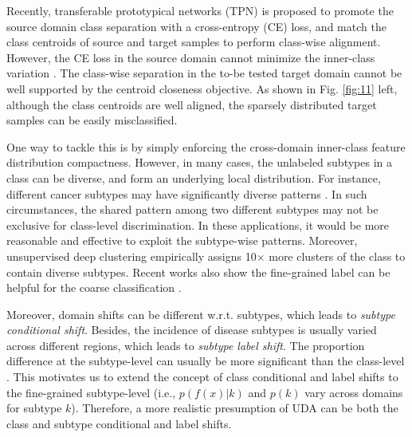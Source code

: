


Recently, transferable prototypical networks (TPN) \cite{pan2019transferrable} is proposed to promote the source domain class separation with a cross-entropy (CE) loss, and match the class centroids of source and target samples to perform class-wise alignment. However, the CE loss in the source domain cannot minimize the inner-class variation \cite{liu2016large}. The class-wise separation in the to-be tested target domain cannot be well supported by the centroid closeness objective. As shown in Fig. \ref{fig:11} left, although the class centroids are well aligned, the sparsely distributed target samples can be easily misclassified. 
 
One way to tackle this is by simply enforcing the cross-domain inner-class feature distribution compactness. However, in many cases, the unlabeled subtypes in a class can be diverse, and form an underlying local distribution. For instance, different cancer subtypes may have significantly diverse patterns \cite{yeoh2002classification}. In such circumstances, the shared pattern among two different subtypes may not be exclusive for class-level discrimination. In these applications, it would be more reasonable and effective to exploit the subtype-wise patterns. Moreover, unsupervised deep clustering \cite{caron2018deep} empirically assigns 10$\times$ more clusters of the class to contain diverse subtypes. Recent works also show the fine-grained label can be helpful for the coarse classification \cite{chen2019understanding}.


Moreover, domain shifts can be different w.r.t. subtypes, which leads to \textit{subtype conditional shift}. Besides, the incidence of disease subtypes is usually varied across different regions, which leads to \textit{subtype label shift}. The proportion difference at the subtype-level can usually be more significant than the class-level \cite{wu2019domain}. This motivates us to extend the concept of class conditional and label shifts \cite{kouw2018introduction} to the fine-grained subtype-level (i.e., $p(f(x)|k)$ and $p(k)$ vary across domains for subtype $k$). Therefore, a more realistic presumption of UDA can be both the class and subtype conditional and label shifts.

